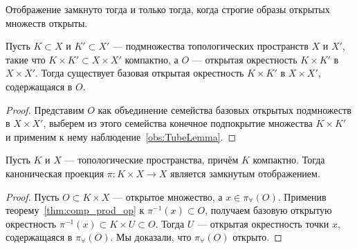 \documentclass[
	extrafontsizes,
	11pt,
	hyphens,
]{memoir}
\begin{document}
\begin{observation}
Отображение замкнуто тогда и только тогда, когда строгие образы открытых множеств открыты.
\end{observation}


\begin{theorem}
Пусть \(K \subset X\) и \(K' \subset X'\) --- подмножества топологических пространств \(X\) и \(X'\), такие что \(K \times K' \subset X \times X'\) компактно, а \(O\) --- открытая окрестность \(K \times K'\) в \(X \times X'\).
\label{thm:comp_prod_op}
Тогда существует базовая открытая окрестность \(K \times K'\) в \(X \times X'\), содержащаяся в \(O\).
\end{theorem}

\begin{proof}
Представим \(O\) как объединение семейства базовых открытых подмножеств в \(X \times X'\), выберем из этого семейства конечное подпокрытие множества \(K \times K'\) и применим к нему наблюдение~\ref{obs:TubeLemma}.
\end{proof}

\begin{lemma}
Пусть \(K\) и \(X\) --- топологические пространства, причём \(K\) компактно.
\label{lem:CompProper}
Тогда каноническая проекция \(\pi : K \times X \to X\) является замкнутым отображением.
\end{lemma}

\begin{proof}
Пусть \(O \subset K \times X\) --- открытое множество, а \(x \in \pi_\forall(O)\).
Применив теорему~\ref{thm:comp_prod_op} к \(\pi^{-1}(x) \subset O\), получаем базовую открытую окрестность \(\pi^{-1}(x) \subset K \times U \subset O\). Тогда \(U\) --- открытая окрестность точки \(x\), содержащаяся в \(\pi_\forall(O)\). Мы доказали, что \(\pi_\forall(O)\) открыто.
\end{proof}
\end{document}
